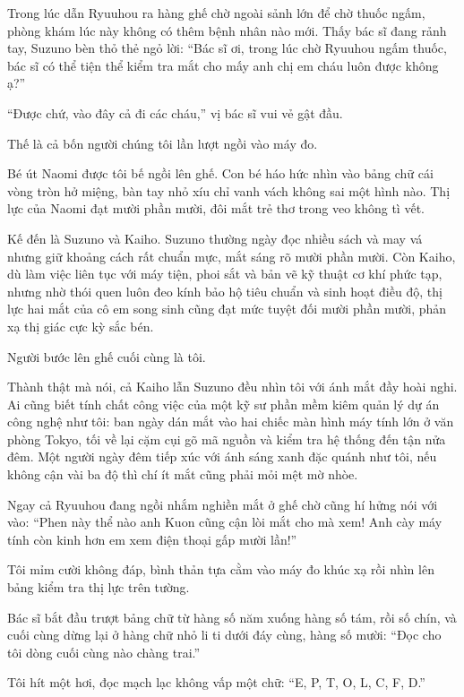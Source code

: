 \documentclass[../main.tex]{subfiles}
\begin{document}
\ct

Trong lúc dẫn Ryuuhou ra hàng ghế chờ ngoài sảnh lớn để chờ thuốc ngấm, phòng khám lúc này không có thêm bệnh nhân nào mới. Thấy bác sĩ đang rảnh tay, Suzuno bèn thỏ thẻ ngỏ lời: ``Bác sĩ ơi, trong lúc chờ Ryuuhou ngấm thuốc, bác sĩ có thể tiện thể kiểm tra mắt cho mấy anh chị em cháu luôn được không ạ?''

``Được chứ, vào đây cả đi các cháu,'' vị bác sĩ vui vẻ gật đầu.

Thế là cả bốn người chúng tôi lần lượt ngồi vào máy đo.

Bé út Naomi được tôi bế ngồi lên ghế. Con bé háo hức nhìn vào bảng chữ cái vòng tròn hở miệng, bàn tay nhỏ xíu chỉ vanh vách không sai một hình nào. Thị lực của Naomi đạt mười phần mười, đôi mắt trẻ thơ trong veo không tì vết.

Kế đến là Suzuno và Kaiho. Suzuno thường ngày đọc nhiều sách và may vá nhưng giữ khoảng cách rất chuẩn mực, mắt sáng rõ mười phần mười. Còn Kaiho, dù làm việc liên tục với máy tiện, phoi sắt và bản vẽ kỹ thuật cơ khí phức tạp, nhưng nhờ thói quen luôn đeo kính bảo hộ tiêu chuẩn và sinh hoạt điều độ, thị lực hai mắt của cô em song sinh cũng đạt mức tuyệt đối mười phần mười, phản xạ thị giác cực kỳ sắc bén.

Người bước lên ghế cuối cùng là tôi.

Thành thật mà nói, cả Kaiho lẫn Suzuno đều nhìn tôi với ánh mắt đầy hoài nghi. Ai cũng biết tính chất công việc của một kỹ sư phần mềm kiêm quản lý dự án công nghệ như tôi: ban ngày dán mắt vào hai chiếc màn hình máy tính lớn ở văn phòng Tokyo, tối về lại cặm cụi gõ mã nguồn và kiểm tra hệ thống đến tận nửa đêm. Một người ngày đêm tiếp xúc với ánh sáng xanh đặc quánh như tôi, nếu không cận vài ba độ thì chí ít mắt cũng phải mỏi mệt mờ nhòe.

Ngay cả Ryuuhou đang ngồi nhắm nghiền mắt ở ghế chờ cũng hí hửng nói với vào: ``Phen này thể nào anh Kuon cũng cận lòi mắt cho mà xem! Anh cày máy tính còn kinh hơn em xem điện thoại gấp mười lần!''

Tôi mỉm cười không đáp, bình thản tựa cằm vào máy đo khúc xạ rồi nhìn lên bảng kiểm tra thị lực trên tường.

Bác sĩ bắt đầu trượt bảng chữ từ hàng số năm xuống hàng số tám, rồi số chín, và cuối cùng dừng lại ở hàng chữ nhỏ li ti dưới đáy cùng, hàng số mười: ``Đọc cho tôi dòng cuối cùng nào chàng trai.''

Tôi hít một hơi, đọc mạch lạc không vấp một chữ: ``E, P, T, O, L, C, F, D.''
\end{document}
